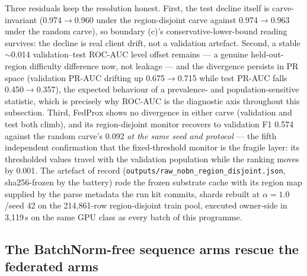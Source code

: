 Three residuals keep the resolution honest. First, the test
decline itself is carve-invariant (0.974$\to$0.960 under the
region-disjoint carve against 0.974$\to$0.963 under the random
carve), so boundary (c)'s conservative-lower-bound reading
survives: the decline is real client drift, not a validation
artefact. Second, a stable $\sim$0.014 validation--test ROC-AUC
level offset remains --- a genuine held-out-region difficulty
difference now, not leakage --- and the divergence persists in PR
space (validation PR-AUC drifting up 0.675$\to$0.715 while test
PR-AUC falls 0.450$\to$0.357), the expected behaviour of a
prevalence- and population-sensitive statistic, which is precisely
why ROC-AUC is the diagnostic axis throughout this subsection.
Third, FedProx shows no divergence in either carve (validation and
test both climb), and its region-disjoint monitor recovers to
validation F1 0.574 against the random carve's 0.092 \emph{at the
same seed and protocol} --- the fifth independent confirmation
that the fixed-threshold monitor is the fragile layer: its
thresholded values travel with the validation population while
the ranking moves by 0.001. The artefact of record
(\texttt{outputs/raw\_nobn\_region\_disjoint.json}, sha256-frozen
by the battery) rode the frozen substrate cache with its region
map supplied by the parse metadata the run kit commits, shards
rebuilt at $\alpha{=}1.0$/seed 42 on the 214{,}861-row
region-disjoint train pool, executed owner-side in 3{,}119\,s on
the same GPU class as every batch of this programme.

\subsection{The BatchNorm-free sequence arms rescue the federated
arms}
\label{sec:res-lstm}

